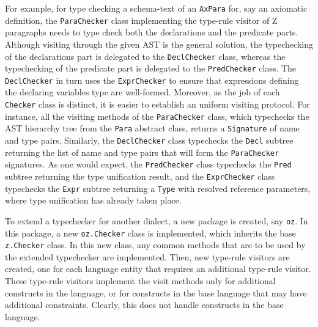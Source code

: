 \documentclass{llncs}
\begin{document}
For example, for type checking a schema-text of an {\tt AxPara} for, say an
axiomatic definition, the {\tt ParaChecker} class implementing the type-rule visitor of Z
paragraphs needs to type check both the declarations and the predicate parts.
Although visiting through the given AST is the
general solution, the typechecking of the declarations part is delegated to the {\tt DeclChecker} class,
whereas the typechecking of the predicate part is delegated to the {\tt PredChecker} class.
The {\tt DeclChecker} in turn uses the {\tt ExprChecker} to ensure that expressions defining the
declaring variables type are well-formed.
Moreover, as the job of each {\tt Checker} class is distinct, it is easier to establish an
uniform visiting protocol. For instance, all the visiting methods of the {\tt ParaChecker} class,
which typechecks the AST hierarchy tree from the {\tt Para} abstract class, returns a {\tt Signature}
of name and type pairs. Similarly, the {\tt DeclChecker} class typechecks the {\tt Decl} subtree
returning the list of name and type pairs that will form the {\tt ParaChecker} signatures.
As one would expect, the {\tt PredChecker} class typechecks the {\tt Pred} subtree
returning the type unification result, and the {\tt ExprChecker} class typechecks the {\tt Expr} subtree
returning a {\tt Type} with resolved reference parameters, where type unification has already taken place.

To extend a typechecker for another dialect, a new package is created, say {\tt oz}.
In this package, a new {\tt oz.Checker} class is implemented, which
inherits the base {\tt z.Checker} class. In this new class, any common
methods that are to be used by the extended typechecker are implemented.
Then, new type-rule visitors are created, one for each language entity that
requires an additional type-rule visitor.  These type-rule visitors
implement the visit methods only for additional constructs in the
language, or for constructs in the base language that may have
additional constraints. Clearly, this does not handle constructs in
the base language.
\end{document}
